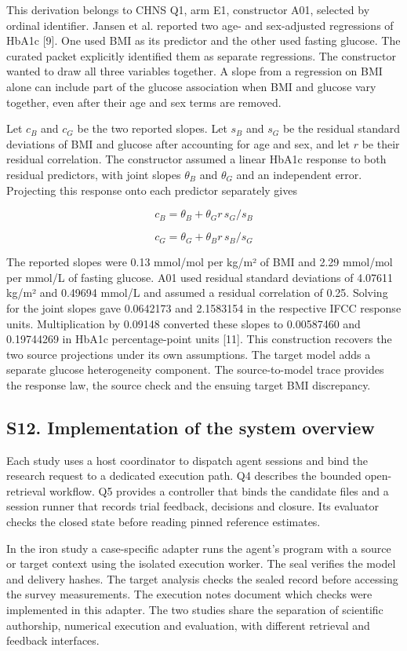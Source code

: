 \documentclass[sigconf,review]{acmart}
\begin{document}
This derivation belongs to CHNS Q1, arm E1, constructor A01, selected by ordinal identifier. Jansen et al. reported two age- and sex-adjusted regressions of HbA1c [9]. One used BMI as its predictor and the other used fasting glucose. The curated packet explicitly identified them as separate regressions. The constructor wanted to draw all three variables together. A slope from a regression on BMI alone can include part of the glucose association when BMI and glucose vary together, even after their age and sex terms are removed.


Let \(c_B\) and \(c_G\) be the two reported slopes. Let \(s_B\) and \(s_G\) be the residual standard deviations of BMI and glucose after accounting for age and sex, and let \(r\) be their residual correlation. The constructor assumed a linear HbA1c response to both residual predictors, with joint slopes \(\theta_B\) and \(\theta_G\) and an independent error. Projecting this response onto each predictor separately gives


\[
c_B = \theta_B + \theta_G r\,s_G/s_B
\]

\[
c_G = \theta_G + \theta_B r\,s_B/s_G
\]

The reported slopes were 0.13 mmol/\allowbreak{}mol per kg/\allowbreak{}m² of BMI and 2.29 mmol/\allowbreak{}mol per mmol/\allowbreak{}L of fasting glucose. A01 used residual standard deviations of 4.07611 kg/\allowbreak{}m² and 0.49694 mmol/\allowbreak{}L and assumed a residual correlation of 0.25. Solving for the joint slopes gave 0.0642173 and 2.1583154 in the respective IFCC response units. Multiplication by 0.09148 converted these slopes to 0.00587460 and 0.19744269 in HbA1c percentage-point units [11]. This construction recovers the two source projections under its own assumptions. The target model adds a separate glucose heterogeneity component. The source-to-model trace provides the response law, the source check and the ensuing target BMI discrepancy.


\subsection*{S12. Implementation of the system overview}

Each study uses a host coordinator to dispatch agent sessions and bind the research request to a dedicated execution path. Q4 describes the bounded open-retrieval workflow. Q5 provides a controller that binds the candidate files and a session runner that records trial feedback, decisions and closure. Its evaluator checks the closed state before reading pinned reference estimates.


In the iron study a case-specific adapter runs the agent's program with a source or target context using the isolated execution worker. The seal verifies the model and delivery hashes. The target analysis checks the sealed record before accessing the survey measurements. The execution notes document which checks were implemented in this adapter. The two studies share the separation of scientific authorship, numerical execution and evaluation, with different retrieval and feedback interfaces.
\end{document}
